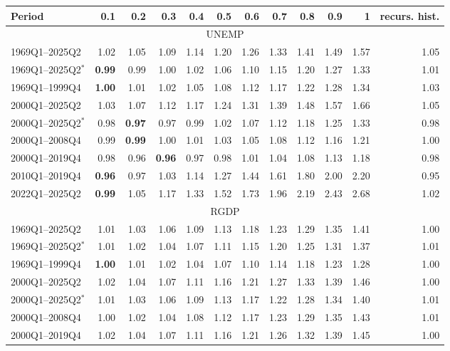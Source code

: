 \begin{tabular}{lrrrrrrrrrrr}
\hline
Period & 0.1 & 0.2 & 0.3 & 0.4 & 0.5 & 0.6 & 0.7 & 0.8 & 0.9 & 1 & recurs. hist. \\
\hline
\multicolumn{12}{c}{UNEMP} \\
1969Q1--2025Q2 & 1.02 & 1.05 & 1.09 & 1.14 & 1.20 & 1.26 & 1.33 & 1.41 & 1.49 & 1.57 & 1.05 \\
1969Q1--2025Q2$^*$ & \textbf{0.99} & 0.99 & 1.00 & 1.02 & 1.06 & 1.10 & 1.15 & 1.20 & 1.27 & 1.33 & 1.01 \\
1969Q1--1999Q4 & \textbf{1.00} & 1.01 & 1.02 & 1.05 & 1.08 & 1.12 & 1.17 & 1.22 & 1.28 & 1.34 & 1.03 \\
2000Q1--2025Q2 & 1.03 & 1.07 & 1.12 & 1.17 & 1.24 & 1.31 & 1.39 & 1.48 & 1.57 & 1.66 & 1.05 \\
2000Q1--2025Q2$^*$ & 0.98 & \textbf{0.97} & 0.97 & 0.99 & 1.02 & 1.07 & 1.12 & 1.18 & 1.25 & 1.33 & 0.98 \\
2000Q1--2008Q4 & 0.99 & \textbf{0.99} & 1.00 & 1.01 & 1.03 & 1.05 & 1.08 & 1.12 & 1.16 & 1.21 & 1.00 \\
2000Q1--2019Q4 & 0.98 & 0.96 & \textbf{0.96} & 0.97 & 0.98 & 1.01 & 1.04 & 1.08 & 1.13 & 1.18 & 0.98 \\
2010Q1--2019Q4 & \textbf{0.96} & 0.97 & 1.03 & 1.14 & 1.27 & 1.44 & 1.61 & 1.80 & 2.00 & 2.20 & 0.95 \\
2022Q1--2025Q2 & \textbf{0.99} & 1.05 & 1.17 & 1.33 & 1.52 & 1.73 & 1.96 & 2.19 & 2.43 & 2.68 & 1.02 \\
\hline
\multicolumn{12}{c}{RGDP} \\
1969Q1--2025Q2 & 1.01 & 1.03 & 1.06 & 1.09 & 1.13 & 1.18 & 1.23 & 1.29 & 1.35 & 1.41 & 1.00 \\
1969Q1--2025Q2$^*$ & 1.01 & 1.02 & 1.04 & 1.07 & 1.11 & 1.15 & 1.20 & 1.25 & 1.31 & 1.37 & 1.01 \\
1969Q1--1999Q4 & \textbf{1.00} & 1.01 & 1.02 & 1.04 & 1.07 & 1.10 & 1.14 & 1.18 & 1.23 & 1.28 & 1.00 \\
2000Q1--2025Q2 & 1.02 & 1.04 & 1.07 & 1.11 & 1.16 & 1.21 & 1.27 & 1.33 & 1.39 & 1.46 & 1.00 \\
2000Q1--2025Q2$^*$ & 1.01 & 1.03 & 1.06 & 1.09 & 1.13 & 1.17 & 1.22 & 1.28 & 1.34 & 1.40 & 1.01 \\
2000Q1--2008Q4 & 1.00 & 1.02 & 1.04 & 1.08 & 1.12 & 1.17 & 1.23 & 1.29 & 1.35 & 1.43 & 1.01 \\
2000Q1--2019Q4 & 1.02 & 1.04 & 1.07 & 1.11 & 1.16 & 1.21 & 1.26 & 1.32 & 1.39 & 1.45 & 1.00 \\

\end{tabular}
